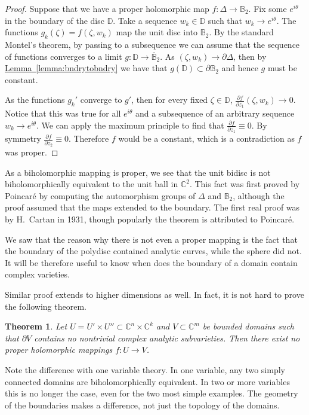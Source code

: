 \documentclass[12pt,openany]{book}
\newcommand{\C}{{\mathbb{C}}}
\newcommand{\bB}{{\mathbb{B}}}
\newcommand{\bD}{{\mathbb{D}}}
\theoremstyle{plain}
\newtheorem{thm}{Theorem}[section]
\theoremstyle{remark}
\theoremstyle{definition}
\theoremstyle{exercise}
\theoremstyle{example}
\newcommand{\lemmaref}[1]{\hyperref[#1]{Lemma~\ref*{#1}}}
\begin{document}
\begin{proof}
Suppose that we have a proper holomorphic map $f \colon \Delta
\to \bB_2$.
Fix some $e^{i\theta}$ in the boundary of the disc $\bD$.  Take a sequence
$w_k \in \bD$ such that $w_k \to e^{i\theta}$.   The functions
$g_k(\zeta) =  f(\zeta,w_k)$ map the unit disc into $\bB_2$.  By the standard
Montel's theorem, by passing to a subsequence we can assume that
the sequence of functions converges to
a limit $g \colon \bD \to \overline{\bB}_2$.  As $(\zeta,w_k) \to \partial
\Delta$, then by
\lemmaref{lemma:bndrytobndry} we have that $g(\bD) \subset \partial \bB_2$
and hence $g$ must be constant.

As the functions $g_k'$ converge 
to $g'$, then for every fixed $\zeta \in \bD$,
$\frac{\partial f}{\partial z_1} (\zeta, w_k) \to 0$.
Notice that this was true for all $e^{i\theta}$ and a subsequence of
an arbitrary sequence $w_k \to e^{i\theta}$.  We can apply the maximum
principle to find that
$\frac{\partial f}{\partial z_1} \equiv 0$.  By symmetry
$\frac{\partial f}{\partial z_2} \equiv 0$.  Therefore $f$ would be a
constant, which is a contradiction as $f$ was proper.
\end{proof}

As a biholomorphic mapping is proper,
we see that the unit bidisc is not biholomorphically
equivalent to the unit ball in $\C^2$.  This fact was first proved by
Poincar\'e by computing the automorphism groups of $\Delta$ and $\bB_2$,
although the proof
assumed that the maps extended to the boundary.  The first
real proof was by H.\ Cartan in 1931, though popularly the theorem is
attributed to Poincar\'e.

We saw that the reason why there is not even a proper mapping is the fact
that the boundary of the polydisc contained analytic curves, while
the sphere did not.  It will be therefore useful to know when does
the boundary of a domain contain complex varieties.

Similar proof extends to higher dimensions as well.  In fact, it is not hard
to prove the following theorem.

\begin{thm}
Let $U = U' \times U'' \subset \C^n \times \C^k$ and $V \subset \C^m$ be bounded
domains such that $\partial V$ contains no nontrivial
complex analytic subvarieties.  Then there exist no proper
holomorphic mappings $f \colon U \to V$.
\end{thm}

Note the difference with one variable theory.  In one variable, any two
simply connected domains are biholomorphically equivalent.  In two or more
variables
this is no longer the case, even for the two most simple examples.  The
geometry of the boundaries makes a difference, not just the topology
of the domains.
\end{document}
